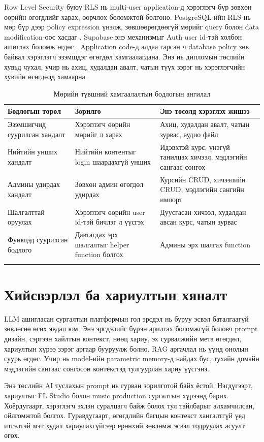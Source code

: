 Row Level Security буюу RLS нь multi-user application-д хэрэглэгч бүр зөвхөн өөрийн өгөгдлийг харах, өөрчлөх боломжтой болгоно. PostgreSQL-ийн RLS нь мөр бүр дээр policy expression үнэлж, зөвшөөрөгдөөгүй мөрийг query болон data modification-оос хасдаг \cite{postgres_rls}. Supabase энэ механизмыг Auth user id-тэй холбон ашиглах боломж өгдөг \cite{supabase_rls}. Application code-д алдаа гарсан ч database policy зөв байвал хэрэглэгч эзэмшдэг өгөгдөл хамгаалагдана. Энэ нь дипломын төслийн хувьд чухал, учир нь ахиц, худалдан авалт, чатын түүх зэрэг нь хэрэглэгчийн хувийн өгөгдөлд хамаарна.

\begin{longtable}{|p{}|p{}|p{}|}
  \hline
  \textbf{Бодлогын төрөл} & \textbf{Зорилго} & \textbf{Энэ төсөлд хэрэглэх жишээ} \\ \hline
  Эзэмшигчид суурилсан хандалт & Хэрэглэгч өөрийн мөрийг л харах & Ахиц, худалдан авалт, чатын зурвас, аудио файл \\ \hline
  Нийтийн унших хандалт & Нийтийн контентыг login шаардахгүй унших & Идэвхтэй курс, үнэгүй танилцах хичээл, мэдлэгийн сангаас сонгох \\ \hline
  Админы удирдах хандалт & Зөвхөн админ өгөгдөл удирдах & Курсийн CRUD, хичээлийн CRUD, мэдлэгийн сангийн импорт \\ \hline
  Шалгалттай оруулах & Хэрэглэгч өөрийн user id-тэй бичлэг л үүсгэх & Дуусгасан хичээл, худалдан авсан курс, чатын зурвас \\ \hline
  Функцэд суурилсан бодлого & Давтагдах эрх шалгалтыг helper function болгох & Админы эрх шалгах function \\ \hline
  \caption{Мөрийн түвшний хамгаалалтын бодлогын ангилал}
  \label{tab:rls-theory}
\end{longtable}

\section{Хийсвэрлэл ба хариултын хяналт}
LLM ашигласан сургалтын платформын гол эрсдэл нь буруу эсвэл баталгаагүй зөвлөгөө өгөх явдал юм. Энэ эрсдэлийг бүрэн арилгах боломжгүй боловч prompt дизайн, сэргээн хайлтын контекст, нөөц хариу, эх сурвалжийн мета өгөгдөл, хариултын хүрээ зэрэг аргаар бууруулж болно. RAG аргачлал нь үүнд онолын суурь өгдөг. Учир нь model-ийн parametric memory-д найдах бус, тухайн домайн мэдлэгийн сангаас сонгосон контекстэд тулгуурлан хариу үүсгэнэ.

Энэ төслийн AI туслахын prompt нь гурван зорилготой байх ёстой. Нэгдүгээрт, хариултыг FL Studio болон music production сургалтын хүрээнд барих. Хоёрдугаарт, хэрэглэгч эхлэн суралцагч байж болох тул тайлбарыг алхамчилсан, ойлгомжтой болгох. Гуравдугаарт, өгөгдлийн багцын контекст хангалтгүй үед итгэлтэй мэт худал хариулахгүйгээр ерөнхий зөвлөмж эсвэл тодруулах асуулт өгөх.

